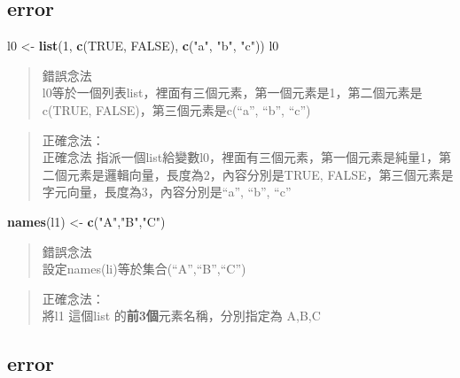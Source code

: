 \documentclass[]{book}
\newenvironment{Shaded}{\begin{snugshade}}{\end{snugshade}}
\newcommand{\DecValTok}[1]{\textcolor[rgb]{0.00,0.00,0.81}{#1}}
\newcommand{\KeywordTok}[1]{\textcolor[rgb]{0.13,0.29,0.53}{\textbf{#1}}}
\newcommand{\NormalTok}[1]{#1}
\newcommand{\OtherTok}[1]{\textcolor[rgb]{0.56,0.35,0.01}{#1}}
\newcommand{\StringTok}[1]{\textcolor[rgb]{0.31,0.60,0.02}{#1}}
\theoremstyle{definition}
\theoremstyle{definition}
\theoremstyle{definition}
\theoremstyle{remark}
\begin{document}
\hypertarget{error}{%
\subsection{error}\label{error}}

\begin{Shaded}
\begin{Highlighting}[]
\NormalTok{l0 <-}\StringTok{ }\KeywordTok{list}\NormalTok{(}\DecValTok{1}\NormalTok{, }\KeywordTok{c}\NormalTok{(}\OtherTok{TRUE}\NormalTok{, }\OtherTok{FALSE}\NormalTok{), }\KeywordTok{c}\NormalTok{(}\StringTok{"a"}\NormalTok{, }\StringTok{"b"}\NormalTok{, }\StringTok{"c"}\NormalTok{))}
\NormalTok{l0}
\end{Highlighting}
\end{Shaded}

\begin{quote}
錯誤念法\\
l0等於一個列表list，裡面有三個元素，第一個元素是1，第二個元素是c(TRUE,
FALSE)，第三個元素是c(``a'', ``b'', ``c'')
\end{quote}

\begin{quote}
正確念法：\\
正確念法
指派一個list給變數l0，裡面有三個元素，第一個元素是純量1，第二個元素是邏輯向量，長度為2，內容分別是TRUE,
FALSE，第三個元素是字元向量，長度為3，內容分別是``a'', ``b'', ``c''
\end{quote}

\begin{Shaded}
\begin{Highlighting}[]
\KeywordTok{names}\NormalTok{(l1) <-}\StringTok{ }\KeywordTok{c}\NormalTok{(}\StringTok{"A"}\NormalTok{,}\StringTok{"B"}\NormalTok{,}\StringTok{"C"}\NormalTok{)}
\end{Highlighting}
\end{Shaded}

\begin{quote}
錯誤念法\\
設定names(li)等於集合(``A'',``B'',``C'')
\end{quote}

\begin{quote}
正確念法：\\
將l1 這個list 的\textbf{前3個}元素名稱，分別指定為 A,B,C
\end{quote}

\hypertarget{error-1}{%
\subsection{error}\label{error-1}}
\end{document}
